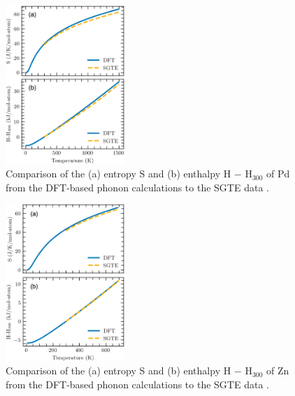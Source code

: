 \begin{figure}[H]
    \centering
    \normalsize
    \includegraphics[width=0.4\textwidth]{intermetallics/Intermetallics-PdZnQHAPd.jpg}
    \caption{Comparison of the (a) entropy S and (b) enthalpy H $-$ H$_{300}$ of Pd from the DFT-based phonon calculations to the SGTE data \cite{dinsdale1991sgte}.}
    \label{intermetallics:fig:PdZnQHAPd}
\end{figure}

\begin{figure}[H]
    \centering
    \normalsize
    \includegraphics[width=0.4\textwidth]{intermetallics/Intermetallics-PdZnQHAZn.jpg}
    \caption{Comparison of the (a) entropy S and (b) enthalpy H $-$ H$_{300}$ of Zn from the DFT-based phonon calculations to the SGTE data \cite{dinsdale1991sgte}.}
    \label{intermetallics:fig:PdZnQHAZn}
\end{figure}

